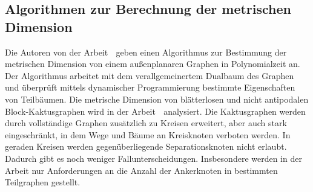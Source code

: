 \subsection{Algorithmen zur Berechnung der metrischen Dimension}
\vspace{-2mm}
Die Autoren von der Arbeit \grqq$\;$\cite{aussenplanar} geben einen Algorithmus zur Bestimmung der metrischen Dimension von einem außenplanaren Graphen in Polynomialzeit an. Der Algorithmus arbeitet mit dem verallgemeinertem Dualbaum des Graphen und überprüft mittels dynamischer Programmierung bestimmte Eigenschaften von Teilbäumen. 
\vspace{-1mm}
\newline\newline
Die metrische Dimension von blätterlosen und nicht antipodalen Block-Kaktusgraphen wird in der Arbeit \grqq$\;$\cite{cactusblock} analysiert. Die Kaktusgraphen werden durch vollständige Graphen zusätzlich zu Kreisen erweitert, aber auch stark eingeschränkt, in dem Wege und Bäume an Kreisknoten verboten werden. In geraden Kreisen werden gegenüberliegende Separationsknoten nicht erlaubt. Dadurch gibt es noch weniger Fallunterscheidungen. Insbesondere werden in der Arbeit nur Anforderungen an die Anzahl der Ankerknoten in bestimmten Teilgraphen gestellt.
\vspace{-5mm}
